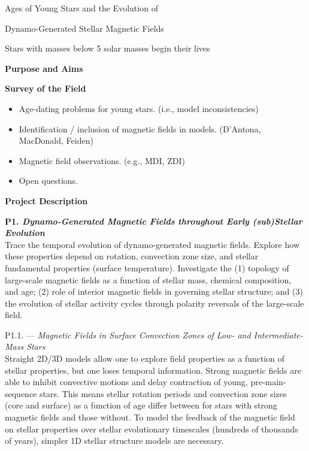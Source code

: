 \documentclass[12pt,a4paper]{article}
\begin{document}
\begin{center}
	{\bf {\LARGE Ages of Young Stars and the Evolution of 
	
	Dynamo-Generated Stellar Magnetic Fields}} 
	
%	
\end{center}
\vspace{\baselineskip}

Stars with masses below 5 solar masses begin their lives

{\bf \large Purpose and Aims}

{\bf \large Survey of the Field}
\begin{itemize}
	\item Age-dating problems for young stars. (i.e., model inconsistencies)
	\item Identification / inclusion of magnetic fields in models. (D'Antona, MacDonald, Feiden)
	\item Magnetic field observations. (e.g., MDI, ZDI)
	\item Open questions.
\end{itemize}

{\bf \large Project Description}

\textbf{P1. \emph{Dynamo-Generated Magnetic Fields throughout Early (sub)Stellar Evolution}} \\
Trace the temporal evolution of dynamo-generated magnetic fields. Explore how these properties depend on rotation, convection zone size, and stellar fundamental properties (surface temperature). Investigate the (1) topology of large-scale magnetic fields as a function of stellar mass, chemical composition, and age; (2) role of interior magnetic fields in governing stellar structure; and (3) the evolution of stellar activity cycles through polarity reversals of the large-scale field.

P1.1. --- \emph{Magnetic Fields in Surface Convection Zones of Low- and Intermediate-Mass Stars} \\
Straight 2D/3D models allow one to explore field properties as a function of stellar properties, but one loses temporal information. Strong magnetic fields are able to inhibit convective motions and delay contraction of young, pre-main-sequence stars. This means stellar rotation periods and convection zone sizes (core and surface) as a function of age differ between for stars with strong magnetic fields and those without. To model the feedback of the magnetic field on stellar properties over stellar evolutionary timescales (hundreds of thousands of years), simpler 1D stellar structure models are necessary. 
\end{document}
